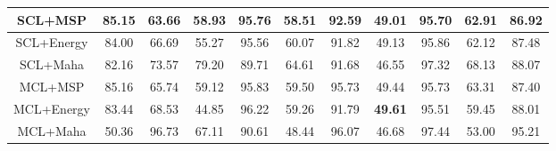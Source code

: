 \begin{table*}[]
\begin{adjustbox}{width=0.9\textwidth}
\begin{tabular}{|ccccccccccc|}
\multicolumn{1}{|c|}{SCL+MSP}            & \multicolumn{1}{c|}{85.15}           & \multicolumn{1}{c|}{63.66}           & \multicolumn{1}{c|}{58.93}           & \multicolumn{1}{c|}{95.76}           & \multicolumn{1}{c|}{58.51}           & \multicolumn{1}{c|}{92.59}           & \multicolumn{1}{c|}{49.01}           & \multicolumn{1}{c|}{95.70}           & \multicolumn{1}{c|}{62.91}           & 86.92           \\ \hline
\multicolumn{1}{|c|}{SCL+Energy}         & \multicolumn{1}{c|}{84.00}           & \multicolumn{1}{c|}{66.69}           & \multicolumn{1}{c|}{55.27}           & \multicolumn{1}{c|}{95.56}           & \multicolumn{1}{c|}{60.07}           & \multicolumn{1}{c|}{91.82}           & \multicolumn{1}{c|}{49.13}           & \multicolumn{1}{c|}{95.86}           & \multicolumn{1}{c|}{62.12}           & 87.48           \\ \hline
\multicolumn{1}{|c|}{SCL+Maha}           & \multicolumn{1}{c|}{82.16}           & \multicolumn{1}{c|}{73.57}           & \multicolumn{1}{c|}{79.20}           & \multicolumn{1}{c|}{89.71}           & \multicolumn{1}{c|}{64.61}           & \multicolumn{1}{c|}{91.68}           & \multicolumn{1}{c|}{46.55}           & \multicolumn{1}{c|}{97.32}           & \multicolumn{1}{c|}{68.13}           & 88.07           \\ \hline
\multicolumn{1}{|c|}{MCL+MSP}            & \multicolumn{1}{c|}{85.16}           & \multicolumn{1}{c|}{65.74}           & \multicolumn{1}{c|}{59.12}           & \multicolumn{1}{c|}{95.83}           & \multicolumn{1}{c|}{59.50}           & \multicolumn{1}{c|}{95.73}           & \multicolumn{1}{c|}{49.44}           & \multicolumn{1}{c|}{95.73}           & \multicolumn{1}{c|}{63.31}           & 87.40           \\ \hline
\multicolumn{1}{|c|}{MCL+Energy}         & \multicolumn{1}{c|}{83.44}           & \multicolumn{1}{c|}{68.53}           & \multicolumn{1}{c|}{44.85}           & \multicolumn{1}{c|}{96.22}           & \multicolumn{1}{c|}{59.26}           & \multicolumn{1}{c|}{91.79}           & \multicolumn{1}{c|}{\textbf{49.61}}  & \multicolumn{1}{c|}{95.51}           & \multicolumn{1}{c|}{59.45}           & 88.01           \\ \hline
\multicolumn{1}{|c|}{MCL+Maha}           & \multicolumn{1}{c|}{50.36}           & \multicolumn{1}{c|}{96.73}           & \multicolumn{1}{c|}{67.11}           & \multicolumn{1}{c|}{90.61}           & \multicolumn{1}{c|}{48.44}           & \multicolumn{1}{c|}{96.07}           & \multicolumn{1}{c|}{46.68}           & \multicolumn{1}{c|}{97.44}           & \multicolumn{1}{c|}{53.00}           & 95.21           \\ \hline

\end{tabular}
\end{adjustbox}
\end{table*}
